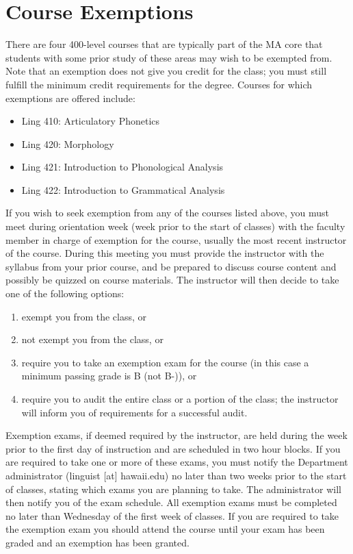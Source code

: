 \documentclass[
]{book}
\providecommand{\tightlist}{%
  \setlength{\itemsep}{0pt}\setlength{\parskip}{0pt}}
\begin{document}
\chapter{Course Exemptions}\label{exemptions}

There are four 400-level courses that are typically part of the MA core that students with some prior study of these areas may wish to be exempted from. Note that an exemption does not give you credit for the class; you must still fulfill the minimum credit requirements for the degree. Courses for which exemptions are offered include:

\begin{itemize}
\tightlist
\item
  Ling 410: Articulatory Phonetics
\item
  Ling 420: Morphology
\item
  Ling 421: Introduction to Phonological Analysis
\item
  Ling 422: Introduction to Grammatical Analysis
\end{itemize}

If you wish to seek exemption from any of the courses listed above, you must meet during orientation week (week prior to the start of classes) with the faculty member in charge of exemption for the course, usually the most recent instructor of the course. During this meeting you must provide the instructor with the syllabus from your prior course, and be prepared to discuss course content and possibly be quizzed on course materials. The instructor will then decide to take one of the following options:

\begin{enumerate}
\def\labelenumi{(\alph{enumi})}
\item
  exempt you from the class, or
\item
  not exempt you from the class, or
\item
  require you to take an exemption exam for the course (in this case a minimum passing grade is B (not B-)), or
\item
  require you to audit the entire class or a portion of the class; the instructor will inform you of requirements for a successful audit.
\end{enumerate}

Exemption exams, if deemed required by the instructor, are held during the week prior to the first day of instruction and are scheduled in two hour blocks. If you are required to take one or more of these exams, you must notify the Department administrator (linguist {[}at{]} hawaii.edu) no later than two weeks prior to the start of classes, stating which exams you are planning to take. The administrator will then notify you of the exam schedule. All exemption exams must be completed no later than Wednesday of the first week of classes. If you are required to take the exemption exam you should attend the course until your exam has been graded and an exemption has been granted.
\end{document}
